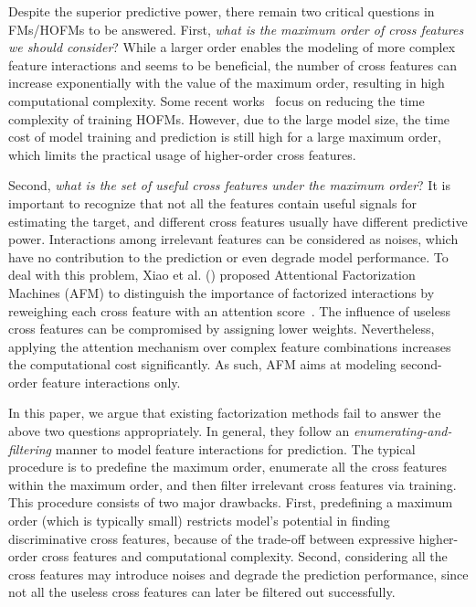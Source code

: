 \documentclass[letterpaper]{article} \usepackage{aaai20}  \usepackage{times}  \usepackage{helvet} \usepackage{courier}  \usepackage[hyphens]{url}  \usepackage{graphicx} \urlstyle{rm} \def\UrlFont{\rm}  \usepackage{graphicx}  \frenchspacing  \setlength{\pdfpagewidth}{8.5in}  \setlength{\pdfpageheight}{11in}
\begin{document}
Despite the superior predictive power, there remain two critical questions in FMs/HOFMs to be answered. First, \emph{what is the maximum order of cross features we should consider}? While a larger order enables the modeling of more complex feature interactions and seems to be beneficial, the number of cross features can increase exponentially with the value of the maximum order, resulting in high computational complexity.
Some recent works~\cite{hofm} focus on reducing the time complexity of training HOFMs. However, due to the large model size, the time cost of model training and prediction is still high for a large maximum order, which limits the practical usage of higher-order cross features.

Second, \emph{what is the set of useful cross features under the maximum order}? It is important to recognize that not all the features contain useful signals for estimating the target, and different cross features usually have different predictive power. Interactions among irrelevant features can be considered as noises, which have no contribution to the prediction or even degrade model performance.
To deal with this problem, Xiao et al. (\citeyear{AFM}) proposed Attentional Factorization Machines (AFM) to distinguish the importance of factorized interactions by reweighing each cross feature with an attention score~\cite{DBLP:journals/corr/BahdanauCB14}. The influence of useless cross features can be compromised by assigning lower weights. Nevertheless, applying the attention mechanism over complex feature combinations increases the computational cost significantly. As such, AFM aims at modeling second-order feature interactions only.


In this paper, we argue that existing factorization methods fail to answer the above two questions appropriately. In general, they follow an \emph{enumerating-and-filtering} manner to model feature interactions for prediction. The typical procedure is to predefine the maximum order, enumerate all the cross features within the maximum order, and then filter irrelevant cross features via training. This procedure consists of two major drawbacks. 
First, predefining a maximum order (which is typically small) restricts model's potential in finding discriminative cross features, because of the trade-off between expressive higher-order cross features and computational complexity.
Second, considering all the cross features may introduce noises and degrade the prediction performance, since not all the useless cross features can later be filtered out successfully.
\end{document}
